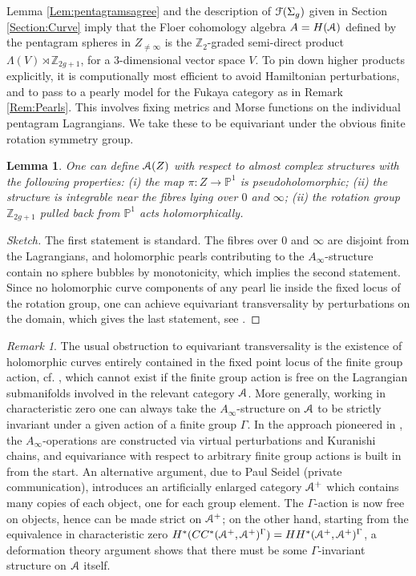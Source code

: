 \documentclass[reqno,10pt]{amsart}
\numberwithin{equation}{section}
\newcommand{\bP}{{\mathbb P}}
\newcommand{\bZ}{{\mathbb Z}}
\newcommand{\scrF}{\EuScript{F}}
\newcommand{\scrA}{\EuScript{A}}
\newtheorem{Lemma}[thm]{Lemma}
\theoremstyle{remark}
\newtheorem{Remark}[thm]{Remark}
\begin{document}
Lemma \ref{Lem:pentagramsagree} and the description of $\scrF(\Sigma_g)$ given in Section \ref{Section:Curve} imply that the Floer cohomology algebra $A=H(\scrA)$ defined by the pentagram spheres in $Z_{\neq\infty}$ is the $\bZ_2$-graded semi-direct product $\Lambda(V)\rtimes \bZ_{2g+1}$, for a 3-dimensional vector space $V$.   To pin down higher products explicitly, it is computionally most efficient to avoid Hamiltonian perturbations, and to pass to a pearly model for the Fukaya category as in 
Remark \ref{Rem:Pearls}. This involves fixing metrics and Morse functions on the individual pentagram Lagrangians. We take these to be equivariant under the obvious finite rotation symmetry group. 

\begin{Lemma} \label{Lem:even}
One can define $\scrA(Z)$ with respect to almost complex structures with the following properties:
(i)  the map $\pi: Z \rightarrow \bP^1$ is pseudoholomorphic; (ii) the structure is integrable near the fibres lying over $0$ and $\infty$;  (ii) the rotation group $\bZ_{2g+1}$ pulled back from $\bP^1$ acts holomorphically.
\end{Lemma}

\begin{proof}[Sketch]
The first statement is standard. The fibres over $0$ and $\infty$ are disjoint from the Lagrangians, and holomorphic pearls contributing to the $A_{\infty}$-structure contain no sphere bubbles by monotonicity, which implies the second statement.  Since no holomorphic curve components of any pearl lie inside the fixed locus of the rotation group, one can achieve equivariant transversality by perturbations on the domain, which gives the last statement, see \cite[Remark 9.1]{Seidel:HMSgenus2}. \end{proof}

\begin{Remark} \label{Rem:EquivtTransverse}
The usual obstruction to equivariant transversality  is the existence of holomorphic curves entirely contained in the fixed point locus of the finite group action, cf. \cite[Lemma 5.12]{KhovanovSeidel}, which cannot exist if the finite group action is free on the Lagrangian submanifolds involved in the relevant category $\scrA$.  More generally, working in characteristic zero one can always take the $A_{\infty}$-structure on $\scrA$  to be strictly invariant under a given action of a finite group $\Gamma$.  In the approach pioneered in \cite{FO3},  the $A_{\infty}$-operations are constructed via virtual perturbations and Kuranishi chains, and equivariance with respect to arbitrary finite group actions is built in from the start. An alternative argument, due to Paul Seidel (private communication),  introduces an artificially enlarged category $\scrA^+$ which contains many copies of each object, one for each group element.  The $\Gamma$-action is now free on objects, hence can be made strict on $\scrA^+$; on the other hand, starting from the equivalence in characteristic zero   $H^*(CC^*(\scrA^+,\scrA^+)^\Gamma) = HH^*(\scrA^+, \scrA^+)^\Gamma$, a deformation theory argument  shows that there must be some $\Gamma$-invariant structure on $\scrA$ itself.
\end{Remark}
\end{document}
